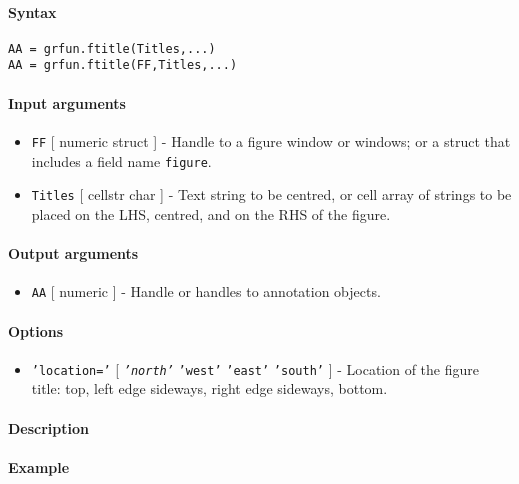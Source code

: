 


	\paragraph{Syntax}\label{syntax}

\begin{verbatim}
AA = grfun.ftitle(Titles,...)
AA = grfun.ftitle(FF,Titles,...)
\end{verbatim}

\paragraph{Input arguments}\label{input-arguments}

\begin{itemize}
\item
  \texttt{FF} {[} numeric \textbar{} struct {]} - Handle to a figure
  window or windows; or a struct that includes a field name
  \texttt{figure}.
\item
  \texttt{Titles} {[} cellstr \textbar{} char {]} - Text string to be
  centred, or cell array of strings to be placed on the LHS, centred,
  and on the RHS of the figure.
\end{itemize}

\paragraph{Output arguments}\label{output-arguments}

\begin{itemize}
\itemsep1pt\parskip0pt
\item
  \texttt{AA} {[} numeric {]} - Handle or handles to annotation objects.
\end{itemize}

\paragraph{Options}\label{options}

\begin{itemize}
\itemsep1pt\parskip0pt
\item
  \texttt{'location='} {[} \emph{\texttt{'north'}} \textbar{}
  \texttt{'west'} \textbar{} \texttt{'east'} \textbar{} \texttt{'south'}
  {]} - Location of the figure title: top, left edge sideways, right
  edge sideways, bottom.
\end{itemize}

\paragraph{Description}\label{description}

\paragraph{Example}\label{example}


